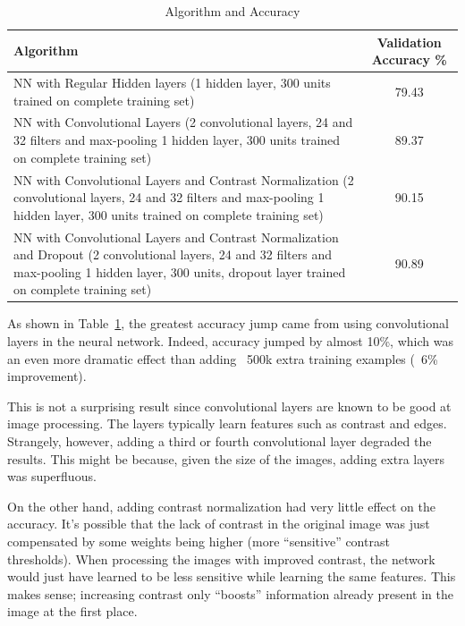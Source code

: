 \documentclass{article} %
\begin{document}
\begin{center}
\begin{table}[h]
  \begin{tabular}{ | p{10cm} || c ||}
    \hline
    Algorithm & Validation Accuracy \% \\ \hline \hline
    NN with Regular Hidden layers (1 hidden layer, 300 units
trained on complete training set) & 79.43 \\ \hline
NN with Convolutional Layers
(2 convolutional layers, 24 and 32 filters and max-pooling
1 hidden layer, 300 units
trained on complete training set) & 89.37 \\ \hline
NN with Convolutional Layers and Contrast Normalization
(2 convolutional layers, 24 and 32 filters and max-pooling
1 hidden layer, 300 units
trained on complete training set) & 90.15 \\ \hline
NN with Convolutional Layers and Contrast Normalization and Dropout
(2 convolutional layers, 24 and 32 filters and max-pooling
1 hidden layer, 300 units, dropout layer
trained on complete training set) & 90.89 \\ \hline
  \end{tabular}

\caption{Algorithm and Accuracy}
\label{table:algo}
\end{table}
\end{center}

As shown in Table~\ref{table:algo}, the greatest accuracy jump came from using convolutional layers in the neural network. Indeed, accuracy jumped by almost 10\%, which was an even more dramatic effect than adding ~500k extra training examples (~6\% improvement).

This is not a surprising result since convolutional layers are known to be good at image processing. The layers typically learn features such as contrast and edges. Strangely, however, adding a third or fourth convolutional layer degraded the results. This might be because, given the size of the images, adding extra layers was superfluous.

On the other hand, adding contrast normalization had very little effect on the accuracy. It’s possible that the lack of contrast in the original image was just compensated by some weights being higher (more “sensitive” contrast thresholds). When processing the images with improved contrast, the network would just have learned to be less sensitive while learning the same features. This makes sense; increasing contrast only “boosts” information already present in the image at the first place\cite{lenet5}.
\end{document}
